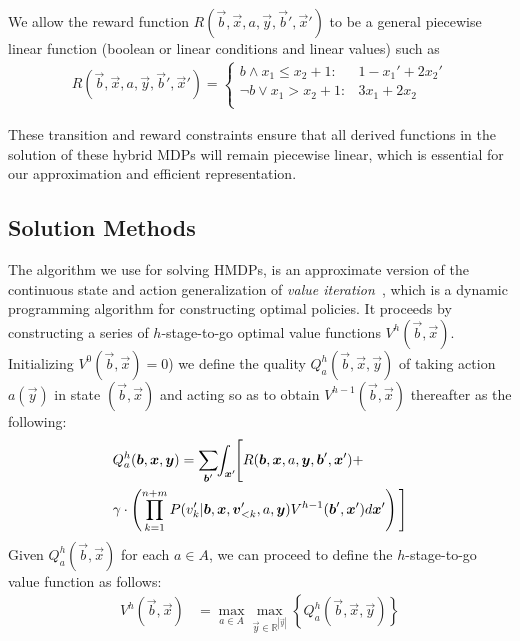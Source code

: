 
We allow the reward function $R(\vec{b},\vec{x},a,\vec{y},\vec{b}',\vec{x}')$ to be
a general piecewise linear function (boolean or linear conditions
and linear values) such as
\begin{align}
R(\vec{b},\vec{x},a,\vec{y},\vec{b}',\vec{x}') = \begin{cases}
b \land x_1 \leq x_2 + 1 : & 1 - x_1' + 2x_2' \\
\neg b \lor x_1 > x_2 + 1:     & 3x_1 + 2x_2 \\
\end{cases} \label{eq:linear_reward}
\end{align}

These transition and reward constraints ensure that all derived
functions in the solution of these hybrid MDPs will remain piecewise linear, which 
is essential for our approximation and efficient representation.

\subsection{Solution Methods}

\label{sec:soln}

The algorithm we use for solving HMDPs, is an approximate version of the continuous state and action generalization of {\it value iteration}~\cite{bellman}, which is a dynamic programming algorithm for constructing optimal policies.  It proceeds by constructing a series of $h$-stage-to-go optimal value functions $V^h(\vec{b},\vec{x})$.
Initializing $V^0(\vec{b},\vec{x}) = 0$) we define the quality
$Q_a^{h}(\vec{b},\vec{x},\vec{y})$ of taking action $a(\vec{y})$ in state
$(\vec{b},\vec{x})$ and acting so as to obtain $V^{h-1}(\vec{b},\vec{x})$ thereafter as the following:
\vspace{-2.5mm}
{\footnotesize
\begin{align}
& Q_a^{h}(\vec{b},\vec{x},\vec{y}) = \sum_{\vec{b}'} \hspace{-1.0mm} \int_{\vec{x}'} \hspace{-1.0mm} \Bigg[ R(\vec{b},\vec{x},a,\vec{y},\vec{b}',\vec{x}') +  \label{eq:qfun} \\ 
& \gamma \cdot \left( \prod_{k=1}^{n+m} P(v_k'| \vec{b},\vec{x}, \vec{v}'_{<k}, a,\vec{y}) V^{h-1}(\vec{b}',\vec{x}') d\vec{x}' \right)  \Bigg] \nonumber
\end{align}}
Given $Q_a^h(\vec{b},\vec{x})$ for each $a \in A$, we can proceed
to define the $h$-stage-to-go value function as follows:
\begin{align}
V^{h}(\vec{b},\vec{x}) & = \max_{a \in A} \max_{\vec{y} \in \mathbb{R}^{|\vec{y}|}} \left\{ Q^{h}_a(\vec{b},\vec{x},\vec{y}) \right\} \label{eq:vfun}
\end{align}

